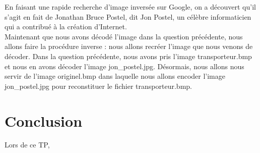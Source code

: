 \documentclass[12pt]{article}
\begin{document}
\newline
En faisant une rapide recherche d'image inversée sur Google, on a découvert qu'il s'agit en fait de Jonathan Bruce Postel, dit Jon Postel, un célèbre informaticien qui a contribué à la création d'Internet. \\
Maintenant que nous avons décodé l'image dans la question précédente, nous allons faire la procédure inverse : nous allons recréer l'image que nous venons de décoder. Dans la question précédente, nous avons pris l'image transporteur.bmp et nous en avons décoder l'image jon\_postel.jpg. Désormais, nous allons nous servir de l'image originel.bmp dans laquelle nous allons encoder l'image jon\_postel.jpg pour reconstituer le fichier transporteur.bmp.


\section{Conclusion}
Lors de ce TP, 
\end{document}
